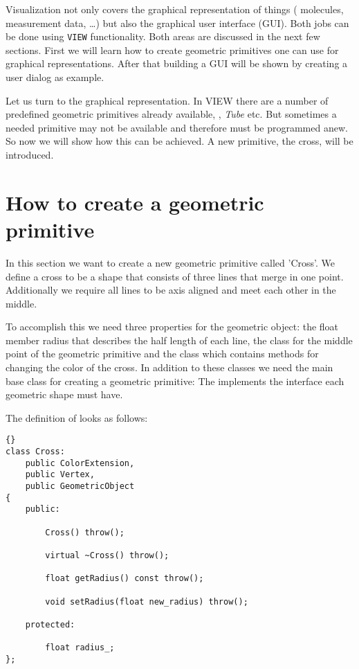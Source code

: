Visualization not only covers the graphical representation of things (\eg
molecules, measurement data, \dots) but also the graphical user interface
(GUI). Both jobs can be done using {\tt VIEW} functionality. Both areas are
discussed in the next few sections. First we will learn how to create
geometric primitives one can use for graphical representations. After that
building a GUI will be shown by creating a user dialog as example.

Let us turn to the graphical representation. In VIEW there are a number of
predefined geometric primitives already available, , {\em
Tube} etc. But sometimes a needed primitive may not be available and
therefore must be programmed anew. So now we will show how this can be
achieved. A new primitive, the cross, will be introduced.

\section{How to create a geometric primitive}
\label{section:view_create_a_geometric_primitive}

In this section we want to create a new geometric primitive called 'Cross'.
We define a cross to be a shape that consists of three lines that merge in one
point. Additionally we require all lines to be axis aligned and meet each
other in the middle.

To accomplish this we need three properties for the geometric object: the
float member radius that describes the half length of each line, the class 
 for the middle point of the geometric primitive and the class 
 which contains methods for changing the color of the
cross. In addition to these classes we need the main base class for
creating a geometric primitive: The  
implements the interface each geometric shape must have.

The definition of  looks as follows:
\begin{lstlisting}{}
class Cross: 
	public ColorExtension,
	public Vertex,
	public GeometricObject
{
	public:

		Cross() throw();

		virtual ~Cross() throw();
		
		float getRadius() const throw();

		void setRadius(float new_radius) throw();

	protected:
					
		float radius_;
};
\end{lstlisting}

